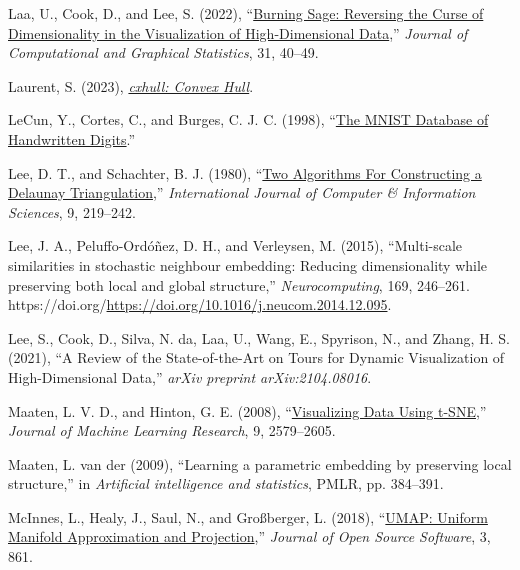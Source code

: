 \documentclass[
  11pt,
  a4paper,
]{report}
\newlength{\cslhangindent}
\newenvironment{CSLReferences}[2] %
 {\begin{list}{}{%
  \setlength{\itemindent}{0pt}
  \setlength{\leftmargin}{0pt}
  \setlength{\parsep}{0pt}
  \ifodd #1
   \setlength{\leftmargin}{\cslhangindent}
   \setlength{\itemindent}{-1\cslhangindent}
  \fi
  \setlength{\itemsep}{#2\baselineskip}}}
 {\end{list}}
\begin{document}
\begin{CSLReferences}{1}{0}
Laa, U., Cook, D., and Lee, S. (2022),
{``\href{/url\%7Bhttps://doi.org/10.1080/10618600.2021.1963264\%7D.}{{Burning
Sage: Reversing the Curse of Dimensionality in the Visualization of
High-Dimensional Data}},''} \emph{Journal of Computational and Graphical
Statistics}, 31, 40--49.

Laurent, S. (2023),
\emph{\href{/url\%7Bhttps://github.com/stla/cxhull\%7D.}{{cxhull: Convex
Hull}}}.

LeCun, Y., Cortes, C., and Burges, C. J. C. (1998),
{``\href{/url\%7Bhttp://yann.lecun.com/exdb/mnist/\%7D.}{{The MNIST
Database of Handwritten Digits}}.''}

Lee, D. T., and Schachter, B. J. (1980),
{``\href{/url\%7Bhttps://doi.org/10.1007/BF00977785\%7D.}{{Two
Algorithms For Constructing a Delaunay Triangulation}},''}
\emph{International Journal of Computer \& Information Sciences}, 9,
219--242.

Lee, J. A., Peluffo-Ordóñez, D. H., and Verleysen, M. (2015),
{``Multi-scale similarities in stochastic neighbour embedding: Reducing
dimensionality while preserving both local and global structure,''}
\emph{Neurocomputing}, 169, 246--261.
https://doi.org/\url{https://doi.org/10.1016/j.neucom.2014.12.095}.

Lee, S., Cook, D., Silva, N. da, Laa, U., Wang, E., Spyrison, N., and
Zhang, H. S. (2021), {``{A Review of the State-of-the-Art on Tours for
Dynamic Visualization of High-Dimensional Data},''} \emph{arXiv preprint
arXiv:2104.08016}.

Maaten, L. V. D., and Hinton, G. E. (2008),
{``\href{/url\%7Bhttps://api.semanticscholar.org/CorpusID:5855042\%7D.}{{Visualizing
Data Using t-SNE}},''} \emph{Journal of Machine Learning Research}, 9,
2579--2605.

Maaten, L. van der (2009), {``Learning a parametric embedding by
preserving local structure,''} in \emph{Artificial intelligence and
statistics}, PMLR, pp. 384--391.

McInnes, L., Healy, J., Saul, N., and Großberger, L. (2018),
{``\href{/url\%7Bhttps://doi.org/10.21105/joss.00861\%7D.}{{UMAP:
Uniform Manifold Approximation and Projection}},''} \emph{Journal of
Open Source Software}, 3, 861.


\end{CSLReferences}
\end{document}
